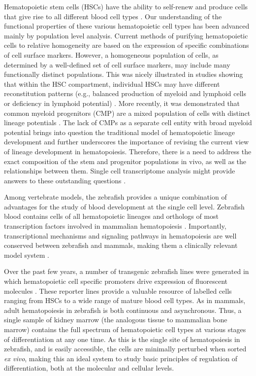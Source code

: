 Hematopoietic stem cells (HSCs) have the ability to self-renew and produce cells that give rise to all different blood cell types \cite{Orkin2008-os}. Our understanding of the functional properties of these various hematopoietic cell types has been advanced mainly by population level analysis. Current methods of purifying hematopoietic cells to relative homogeneity are based on the expression of specific combinations of cell surface markers. However, a homogeneous population of cells, as determined by a well-defined set of cell surface markers, may include many functionally distinct populations. This was nicely illustrated in studies showing that within the HSC compartment, individual HSCs may have different reconstitution patterns (e.g., balanced production of myeloid and lymphoid cells or deficiency in lymphoid potential) \cite{Muller-Sieburg2012-vb}. More recently, it was demonstrated that common myeloid progenitors (CMP) are a mixed population of cells with distinct lineage potentials \cite{Notta2015-ng}. The lack of CMPs as a separate cell entity with broad myeloid potential brings into question the traditional model of hematopoietic lineage development and further underscores the importance of revising the current view of lineage development in hematopoiesis. Therefore, there is a need to address the exact composition of the stem and progenitor populations in vivo, as well as the relationships between them. Single cell transcriptome analysis might provide answers to these outstanding questions \cite{Cvejic2015-ra}.

Among vertebrate models, the zebrafish provides a unique combination of advantages for the study of blood development at the single cell level. Zebrafish blood contains cells of all hematopoietic lineages and orthologs of most transcription factors involved in mammalian hematopoiesis \cite{Hsia2005-fg, Song2004-jn}. Importantly, transcriptional mechanisms and signaling pathways in hematopoiesis are well conserved between zebrafish and mammals, making them a clinically relevant model system \cite{Jagannathan-Bogdan2013-du}.

Over the past few years, a number of transgenic zebrafish lines were generated in which hematopoietic cell specific promoters drive expression of fluorescent molecules \cite{Carradice2008-lz}. These reporter lines provide a valuable resource of labelled cells ranging from HSCs to a wide range of mature blood cell types. As in mammals, adult hematopoiesis in zebrafish is both continuous and asynchronous. Thus, a single sample of kidney marrow (the analogous tissue to mammalian bone marrow) contains the full spectrum of hematopoietic cell types at various stages of differentiation at any one time. As this is the single site of hematopoiesis in zebrafish, and is easily accessible, the cells are minimally perturbed when sorted \textit{ex vivo}, making this an ideal system to study basic principles of regulation of differentiation, both at the molecular and cellular levels.

